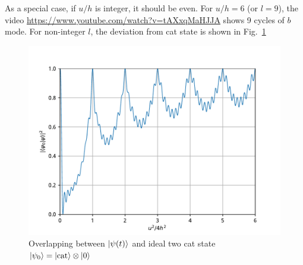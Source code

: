 \documentclass[11pt]{article}
\begin{document}
As a special case, if $u/h$ is integer, it should be even. For $u/h=6$ (or $l=9$), the video \url{https://www.youtube.com/watch?v=tAXxqMaHJJA} shows 9 cycles of $b$ mode. For non-integer $l$, the deviation from cat state is shown in Fig.~\ref{l}
\begin{figure}[htbp!]
\centering
\includegraphics[width=\textwidth]{fidelity.pdf}
\caption{Overlapping between $\ket{\psi(t)}$ and ideal two cat state $\ket{\psi_0}=\ket{\mathrm{cat}}\otimes\ket{0}$}\label{l}
\end{figure}
\end{document}
